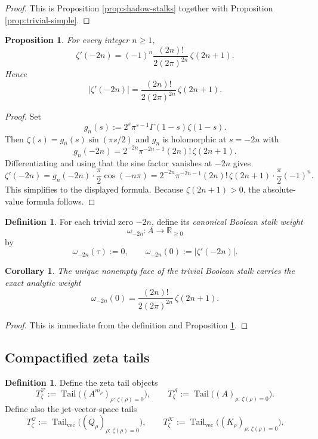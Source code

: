 \documentclass[11pt,a4paper]{article}
\newtheorem{proposition}[theorem]{Proposition}
\newtheorem{corollary}[theorem]{Corollary}
\theoremstyle{definition}
\newtheorem{definition}[theorem]{Definition}
\theoremstyle{remark}
\DeclareMathOperator{\Tail}{Tail}
\newcommand{\RR}{\mathbb R}
\newcommand{\cV}{\mathcal V}
\newcommand{\cA}{\mathcal A}
\newcommand{\cQ}{\mathcal Q}
\newcommand{\cK}{\mathcal K}
\newcommand{\taup}{\tau}
\begin{document}
\begin{proof}
This is Proposition \ref{prop:shadow-stalks} together with Proposition \ref{prop:trivial-simple}.
\end{proof}

\begin{proposition}\label{prop:trivial-derivative}
For every integer $n\ge1$,
\[
\zeta'(-2n)=(-1)^n\frac{(2n)!}{2(2\pi)^{2n}}\,\zeta(2n+1).
\]
Hence
\[
|\zeta'(-2n)|=\frac{(2n)!}{2(2\pi)^{2n}}\,\zeta(2n+1).
\]
\end{proposition}

\begin{proof}
Set
\[
g_n(s):=2^s\pi^{s-1}\Gamma(1-s)\zeta(1-s).
\]
Then $\zeta(s)=g_n(s)\sin(\pi s/2)$ and $g_n$ is holomorphic at $s=-2n$ with
\[
g_n(-2n)=2^{-2n}\pi^{-2n-1}(2n)!\,\zeta(2n+1).
\]
Differentiating and using that the sine factor vanishes at $-2n$ gives
\[
\zeta'(-2n)=g_n(-2n)\cdot \frac\pi2\cos(-n\pi)
=2^{-2n}\pi^{-2n-1}(2n)!\,\zeta(2n+1)\cdot\frac\pi2(-1)^n.
\]
This simplifies to the displayed formula.  Because $\zeta(2n+1)>0$, the absolute-value formula follows.
\end{proof}

\begin{definition}
For each trivial zero $-2n$, define its \emph{canonical Boolean stalk weight}
\[
\omega_{-2n}:A\to\RR_{\ge0}
\]
by
\[
\omega_{-2n}(\taup):=0,
\qquad
\omega_{-2n}(0):=|\zeta'(-2n)|.
\]
\end{definition}

\begin{corollary}\label{cor:trivial-weight}
The unique nonempty face of the trivial Boolean stalk carries the exact analytic weight
\[
\omega_{-2n}(0)=\frac{(2n)!}{2(2\pi)^{2n}}\,\zeta(2n+1).
\]
\end{corollary}

\begin{proof}
This is immediate from the definition and Proposition \ref{prop:trivial-derivative}.
\end{proof}

\subsection{Compactified zeta tails}

\begin{definition}
Define the zeta tail objects
\[
T_\zeta^{\cV}:=\Tail\bigl((A^{m_\rho})_{\rho:\,\zeta(\rho)=0}\bigr),
\qquad
T_\zeta^{\cA}:=\Tail\bigl((A)_{\rho:\,\zeta(\rho)=0}\bigr).
\]
Define also the jet-vector-space tails
\[
T_\zeta^{\cQ}:=\Tail_{\mathrm{vec}}\bigl((Q_\rho)_{\rho:\,\zeta(\rho)=0}\bigr),
\qquad
T_\zeta^{\cK}:=\Tail_{\mathrm{vec}}\bigl((K_\rho)_{\rho:\,\zeta(\rho)=0}\bigr).
\]
\end{definition}
\end{document}
